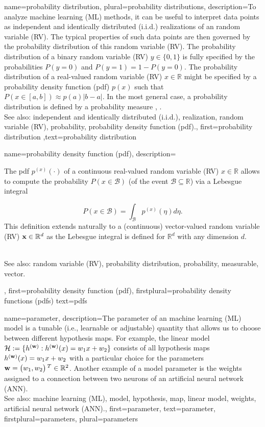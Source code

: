 {
{name={probability distribution}, plural={probability distributions},
	description={To analyze machine learning (ML) methods, it can be useful 
		to interpret data points as independent and identically distributed (i.i.d.) realizations of an random variable (RV). The typical 
		properties of such data points are then governed by the probability distribution 
		of this random variable (RV). The probability distribution of a binary random variable (RV) $y \in \{0,1\}$ 
		is fully specified by the probabilities $P\left(y = 0\right)$ and 
		$P\left(y=1\right)\!=\!1\!-\!P\left(y=0\right)$. The probability 
		distribution of a real-valued random variable (RV) $x \in \mathbb{R}$ might be specified 
		by a probability density function (pdf) $p(x)$ such that $P\left( x \in [a,b] \right) \approx  p(a) |b-a|$. 
	    	In the most general case, a probability distribution is defined by a probability measure 
		\cite{BillingsleyProbMeasure}, \cite{GrayProbBook}.
	    		\\
		See also: independent and identically distributed (i.i.d.), realization, random variable (RV), probability, probability density function (pdf).},
	first={probability distribution}
	,text={probability distribution}
}
    
    
{name={probability density function (pdf)},
	description={The pdf 
	$p^{(x)}\left(\cdot\right)$ of a continuous real-valued random variable (RV) $x \in \mathbb{R}$ 
	allows to compute the probability $P\left(x \in \mathcal{B}\right)$ (of 
	the event $\mathcal{B} \subseteq \mathbb{R}$)
	via a Lebesgue integral \cite[Ch. 3]{BertsekasProb}
	
	
	
	 $$P\left(x \in \mathcal{B}\right) = \int_{\mathcal{B}} p^{(x)}\left(\eta\right) d 
	 \eta.$$ 
	 This definition extends naturally to a (continuous) vector-valued random variable (RV) 
	 ${\bf x} \in \mathbb{R}^{d}$ as the Lebesgue integral 
	 is defined for $\mathbb{R}^{d}$ with any dimension $d$. 
	
	
	
    
        		\\
		See also: random variable (RV), probability distribution, probability, measurable, vector.},
	first={probability density function (pdf)},
	firstplural={probability density functions (pdfs)}
	text={pdfs}
}


{name={parameter},
	description={The parameter of an machine learning (ML) model is a tunable (i.e., learnable or adjustable) quantity that 
		allows us to choose between different hypothesis maps. For example, the linear model 
		$\mathcal{H} := \{h^{({\bf w})}: h^{({\bf w})}(x)= w_{1} x + w_{2}\}$ 
		consists of all hypothesis maps $h^{({\bf w})}(x)= w_{1} x + w_{2}$ 
		with a particular choice for the parameters ${\bf w} = \big(w_{1},w_{2}\big)\,^{T} \in \mathbb{R}^{2}$. 
		Another example of a model parameter is the weights assigned to a connection between two neurons of an artificial neural network (ANN).
				\\
		See also: machine learning (ML), model, hypothesis, map, linear model, weights, artificial neural network (ANN).},
	first={parameter},
	text={parameter},
	firstplural={parameters}, 
 	plural={parameters}
}

}
